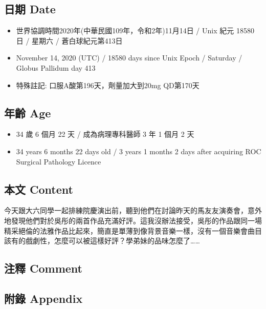 \documentclass[
]{article}
\providecommand{\tightlist}{%
  \setlength{\itemsep}{0pt}\setlength{\parskip}{0pt}}
\begin{document}
\hypertarget{ux65e5ux671f-date-10}{%
\subsection{日期 Date}\label{ux65e5ux671f-date-10}}

\begin{itemize}
\tightlist
\item
  世界協調時間2020年(中華民國109年，令和2年)11月14日 / Unix 紀元 18580
  日 / 星期六 / 蒼白球紀元第413日
\item
  November 14, 2020 (UTC) / 18580 days since Unix Epoch / Saturday /
  Globus Pallidum day 413
\item
  特殊註記: 口服A酸第196天，劑量加大到20mg QD第170天
\end{itemize}

\hypertarget{ux5e74ux9f61-age-10}{%
\subsection{年齡 Age}\label{ux5e74ux9f61-age-10}}

\begin{itemize}
\tightlist
\item
  34 歲 6 個月 22 天 / 成為病理專科醫師 3 年 1 個月 2 天
\item
  34 years 6 months 22 days old / 3 years 1 months 2 days after
  acquiring ROC Surgical Pathology Licence
\end{itemize}

\hypertarget{ux672cux6587-content-10}{%
\subsection{本文 Content}\label{ux672cux6587-content-10}}

今天跟大六同學一起排練院慶演出前，聽到他們在討論昨天的馬友友演奏會，意外地發現他們對於吳彤的兩首作品充滿好評。這我沒辦法接受，吳彤的作品跟同一場精采絕倫的法雅作品比起來，簡直是單薄到像背景音樂一樣，沒有一個音樂會曲目該有的戲劇性，怎麼可以被這樣好評？學弟妹的品味怎麼了\ldots\ldots{}

\hypertarget{ux6ce8ux91cb-comment-10}{%
\subsection{注釋 Comment}\label{ux6ce8ux91cb-comment-10}}

\hypertarget{ux9644ux9304-appendix-10}{%
\subsection{附錄 Appendix}\label{ux9644ux9304-appendix-10}}
\end{document}
